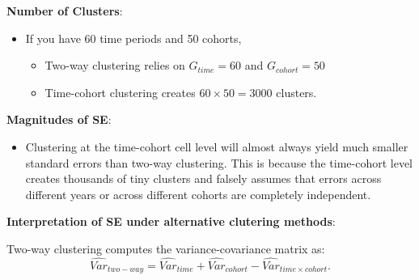 \documentclass[10pt]{article}
\begin{document}
{\textbf {Number of Clusters}}:
\begin{itemize}
\item If you have 60 time periods and 50 cohorts,
		\begin{itemize}
		\item Two-way clustering relies on $ G_{time} = 60 $ and $ G_{cohort} = 50 $
		\item Time-cohort clustering creates $ 60  \times 50 = 3000 $ clusters.
		\end{itemize}
\end{itemize}


{\textbf {Magnitudes of SE}}:
\begin{itemize}
\item 
Clustering at the time-cohort cell level will almost always yield much smaller standard errors than two-way clustering. This is because the time-cohort level creates thousands of tiny clusters and falsely assumes that errors across different years or across different cohorts are completely independent.
\end{itemize}


{\textbf {Interpretation of SE under alternative clutering methods}}:

Two-way clustering computes the variance-covariance matrix as:
\begin{equation*}
 \widehat{Var}_{two-way} =  \widehat{Var}_{time} +  \widehat{Var}_{cohort} -  \widehat{Var}_{time \times cohort}.
 \label{eqn:two_way_clustering_math}
\end{equation*}
\end{document}
